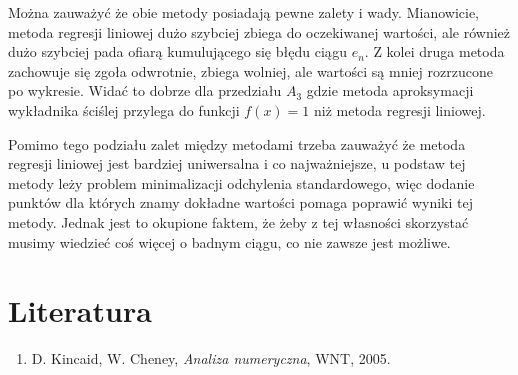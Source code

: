 \documentclass[11pt,wide]{mwart}
\begin{document}
Można zauważyć że obie metody posiadają pewne zalety i wady.
Mianowicie, metoda regresji liniowej dużo szybciej zbiega do oczekiwanej wartości, ale również dużo szybciej pada ofiarą kumulującego się błędu ciągu $e_n$.
Z kolei druga metoda zachowuje się zgoła odwrotnie, zbiega wolniej, ale wartości są mniej rozrzucone po wykresie.
Widać to dobrze dla przedziału $A_3$ gdzie metoda aproksymacji wykładnika ściślej przylega do funkcji $f(x) = 1$ niż metoda regresji liniowej.

Pomimo tego podziału zalet między metodami trzeba zauważyć że metoda regresji liniowej jest bardziej uniwersalna i co najważniejsze,
u podstaw tej metody leży problem minimalizacji odchylenia standardowego, więc dodanie punktów dla których znamy dokładne wartości pomaga
poprawić wyniki tej metody. Jednak jest to okupione faktem, że żeby z tej własności skorzystać musimy wiedzieć coś więcej o badnym ciągu, co nie zawsze jest możliwe.

\section{Literatura}

\begin{enumerate}
	\item  D. Kincaid, W. Cheney, \textit{Analiza numeryczna}, WNT, 2005.
\end{enumerate}


\vspace{1cm}
\end{document}
